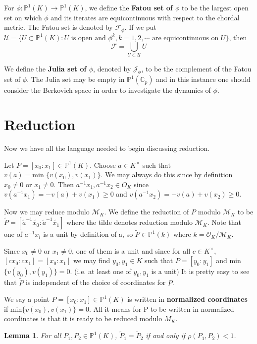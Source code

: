\documentclass[12pt]{amsart}
\newtheorem{lem}[thm]{Lemma}
\theoremstyle{definition}
\theoremstyle{remark}
\theoremstyle{definition}
\newcommand{\sbs}{\subset}
\newcommand{\C}{\mathbb{C}}
\renewcommand{\P}{\mathbb{P}}
\newcommand{\MCM}{\mathcal{M}}
\newcommand{\MCF}{\mathcal{F}}
\newcommand{\MCJ}{\mathcal{J}}
\newcommand{\MCO}{\mathcal{O}}
\newcommand{\MCU}{\mathcal{U}}
\begin{document}
For $\phi:\P^1(K) \rightarrow \P^1(K)$, we define the \textbf{Fatou set of $\phi$} to be the largest open set on which $\phi$ and its iterates are equicontinuous with respect to the chordal metric. The Fatou set is denoted by $\MCF_{\phi}$. If we put \\$\MCU = \{U \sbs \P^1(K): U \text{ is open and }\phi^k, k=1,2,\cdots \text{ are equicontinuous on } U \}$, then 
$$\MCF = \bigcup_{U \sbs \MCU} U$$

We define the \textbf{Julia set of $\phi$}, denoted by $\MCJ_{\phi}$, to be the complement of the Fatou set of $\phi$. The Julia set may be empty in $\P^1(\C_p)$ and in this instance one should consider the Berkovich space in order to investigate the dynamics of $\phi$.
 
\section{Reduction}


Now we have all the language needed to begin discussing reduction.  

Let $P=[x_0:x_1] \in \mathbb{P}^{1}(K)$.  Choose $a \in K^{\times}$ such that $v(a)=\text{min } \{v(x_0),v(x_1)\}$.  We may always do this since by definition $x_0 \neq 0$ or $x_1 \neq 0$.  Then $a^{-1}x_1, a^{-1}x_2 \in O_K$ since $v(a^{-1}x_1)=-v(a)+v(x_1) \geq 0$ and $v(a^{-1}x_2)=-v(a)+v(x_2) \geq 0$.

Now we may reduce modulo $\MCM_K$.  We define the reduction of $P$ modulo $\MCM_K$ to be $\tilde{P}=[\tilde{a}^{-1}\tilde{x_0}: \tilde{a}^{-1}\tilde{x_1}]$ where the tilde denotes reduction modulo $\MCM_K$.  Note that one of $a^{-1}x_i$ is a unit by definition of a, so $\tilde{P} \in \mathbb{P}^1(k)$ where $k = \MCO_K/\MCM_K$. 

Since $x_0 \neq 0$ or $x_1 \neq 0$, one of them is a unit and since for all $c \in K^{\times}$, $[cx_0:cx_1]=[x_0:x_1]$ we may find $y_0,y_1 \in K$ such that $P=[y_0:y_1]$ and min$\{v(y_0),v(y_1)\}=0$.  (i.e. at least one of $y_0,y_1$ is a unit)
It is pretty easy to see that $\tilde{P}$ is independent of the choice of coordinates for $P$.

We say a point $P=[x_0:x_1] \in \mathbb{P}^1(K)$ is written in \textbf{normalized coordinates} if min$\{v(x_0),v(x_1)\}=0$. All it means for P to be written in normalized coordinates is that it is ready to be reduced modulo $M_K$.  

\begin{lem}
For all $P_1,P_2 \in \mathbb{P}^1(K)$, $\tilde{P}_1=\tilde{P}_2$ if and only if $\rho(P_1,P_2)<1$. 
\end{lem}
\end{document}

